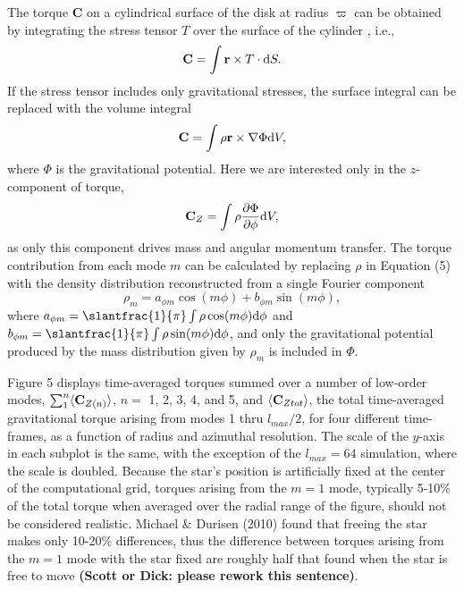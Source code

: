 \documentclass[manuscript]{aastex}
\begin{document}
The torque {\bf C} on a cylindrical surface of the disk at radius $\varpi$ can be obtained by integrating the stress tensor $T$ over the surface of the cylinder \citep{lyndenbell1972}, i.e.,
\begin{equation}
{\rm {\bf C}} = \int {\bf r} \times T \cdot {\rm d}S.
\end{equation}
If the stress tensor includes only gravitational stresses, the surface integral can be replaced with the volume integral
\begin{equation}
{\rm \bf C} = \int \rho {\bf r} \times \nabla \Phi {\rm d}V,
\end{equation}
where $\Phi$ is the gravitational potential.  Here we are interested only in the $z$-component of torque,  
\begin{equation}
\label{torque1}
{\rm \bf C}_Z = \int \rho \frac{\partial\Phi} {\partial \phi} {\rm d}V,
\end{equation}
as only this component drives mass and angular momentum transfer. The torque contribution from each mode $m$ can be calculated by replacing $\rho$ in Equation (5) with the density distribution reconstructed from a single Fourier component
\begin{equation}
\rho_m = a_{\phi m} \cos(m\phi) + b_{\phi m} \sin(m\phi),
\end{equation}
where $a_{\phi m} =\slantfrac{1}{\pi} \int \rho \cos(m\phi){\rm d}\phi$ and $b_{\phi m} =\slantfrac{1}{\pi} \int \rho \sin(m\phi){\rm d}\phi$, and only the gravitational potential produced by the mass distribution given by $\rho_m$ is included in $\Phi$.

Figure 5  displays 
 time-averaged torques summed over a number of low-order modes, $\sum_1^n \langle {\rm \bf C}_{Z(n)} \rangle$, $n = $ 1, 2, 3, 4, and 5, and $\langle {\rm \bf C}_{Ztot} \rangle$,
the total time-averaged gravitational torque arising from modes 1 thru $l_{max}/2$, for four different time-frames,
as a function of radius and azimuthal resolution. 
The scale of the $y$-axis in each subplot is the same, with the exception of the $l_{max} = 64$ simulation, 
where the scale is doubled.  
Because the star's position is artificially fixed at the center of the computational grid, 
torques arising from the $m=1$ mode,
typically 5-10\% of the total torque when averaged over the radial range of the figure,
should not be considered realistic.  
Michael \& Durisen (2010) found that freeing the star makes only 10-20\%
differences,  thus the difference between torques arising from the $m=1$ mode with the star fixed are roughly half that found when the star is free to move {\bf (Scott or Dick: please rework this sentence)}. 
\end{document}
